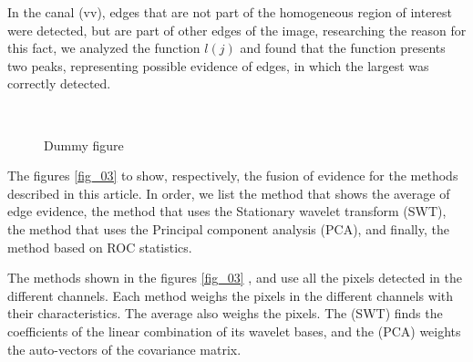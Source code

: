 \documentclass[conference]{IEEEtran}
\begin{document}
In the canal (vv), edges that are not part of the homogeneous region of interest were detected, but are part of other edges of the image, researching the reason for this fact, we analyzed the function $l(j)$ and found that the function presents two peaks, representing possible evidence of edges, in which the largest was correctly detected. 



   \begin{figure}[!ht]
     \hfill
     \\
     \centering
     \caption{Dummy figure}
     \label{fig_02}
   \end{figure}

The figures \ref{fig_03}  to  show, respectively, the fusion of evidence for the methods described in this article. In order, we list the method that shows the average of edge evidence, the method that uses the Stationary wavelet transform (SWT), the method that uses the Principal component analysis (PCA), and finally, the method based on ROC statistics.

The methods shown in the figures \ref{fig_03} ,  and  use all the pixels detected in the different channels. Each method weighs the pixels in the different channels with their characteristics. The average also weighs the pixels. The (SWT) finds the coefficients of the linear combination of its wavelet bases, and the (PCA) weights the auto-vectors of the covariance matrix.
\end{document}
